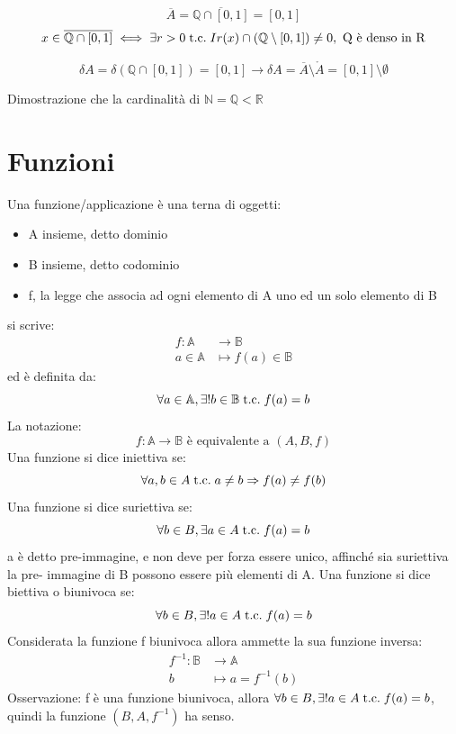 \documentclass[a4paper, 12pt, openany]{book}
\begin{document}
	 \[\overline{A} = \overline{\mathbb{Q} \cap [0,1]} = [0,1]\]
	 \[x \in \overline{\mathbb{Q} \cap [0,1]} \iff \exists r > 0 \;\text{t.c.}\; Ir(x) \cap (\mathbb{Q} \setminus [0,1]) \not = 0, \text{ Q è denso in R}\]
	 
	 \[\delta A = \delta (\mathbb{Q} \cap [0,1]) = [0,1] \rightarrow \delta A = \overline{A} \setminus \mathring{A} = [0,1] \setminus \emptyset\]
	 
	 Dimostrazione che la cardinalità di $\mathbb{N} = \mathbb{Q} < \mathbb{R}$
	 
	 \chapter{Funzioni}
	 Una funzione/applicazione è una terna di oggetti:
	 \begin{itemize}
	 	\item A insieme, detto dominio
	 	\item B insieme, detto codominio
	 	\item f, la legge che associa ad ogni elemento di A uno ed un solo elemento di B
	 \end{itemize}
	 si scrive:
	 \begin{align*}
	 	f: \mathbb{A} & \longrightarrow \mathbb{B} \\
	 	a \in \mathbb{A} & \longmapsto f(a) \in \mathbb{B}
	 \end{align*}
	 ed è definita da:
	 \[\forall a \in \mathbb{A}, \exists ! b \in \mathbb{B} \;\text{t.c.}\; f(a) = b\]
	 La notazione: \[f: \mathbb{A} \longrightarrow \mathbb{B} \text{ è equivalente a } (A, B, f)\]
	 Una funzione si dice iniettiva se:
	 \[\forall a,b \in A \;\text{t.c.}\; a \not = b \Rightarrow f(a) \not = f(b)\]
	 Una funzione si dice suriettiva se:
	 \[\forall b \in B, \exists a \in A \;\text{t.c.}\; f(a) = b\]
	 a è detto pre-immagine, e non deve per forza essere unico, affinché sia suriettiva la pre- immagine di B possono essere più elementi di A.\newline
	 Una funzione si dice biettiva o biunivoca se:
	 \[\forall b \in B, \exists ! a \in A \;\text{t.c.}\; f(a) = b\]
	 Considerata la funzione f biunivoca allora ammette la sua funzione inversa:
	 \begin{align*}
	 	f^{-1}: \mathbb{B} & \longrightarrow \mathbb{A} \\
	 	b & \longmapsto a = f^{-1}(b)
	 \end{align*}
	 Osservazione: f è una funzione biunivoca, allora $\forall b \in B, \exists ! a \in A \;\text{t.c.}\; f(a) = b$, quindi la funzione $(B, A, f^{-1})$ ha senso.
	 
\end{document}
